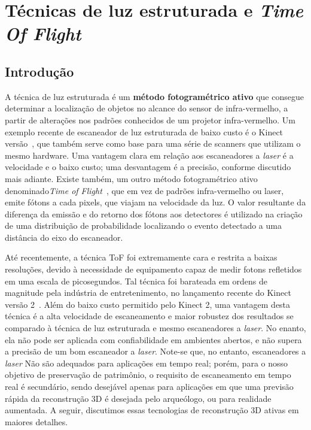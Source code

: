\chapter{Técnicas de luz estruturada e \emph{Time Of Flight}}\label{cap:kinect}

\section*{Introdução}

A técnica de luz estruturada é um
\textbf{método fotogramétrico ativo} que consegue determinar a localização de objetos
no alcance do sensor de infra-vermelho, a partir de alterações nos padrões conhecidos de um projetor 
infra-vermelho. Um exemplo recente de escaneador de luz estruturada de baixo custo
é o Kinect versão~\cite{smisek20133d}, que também serve como base para uma
série de scanners que utilizam o mesmo hardware. Uma vantagem clara em relação
aos escaneadores a \emph{laser} é a velocidade e o baixo custo; uma desvantagem
é a precisão, conforme discutido mais adiante.  Existe também, um outro método
fotogramétrico ativo denominado\emph{Time of Flight}~\cite{gokturk2004time},
que em vez de padrões infra-vermelho ou laser, emite fótons a cada pixels, que
viajam na velocidade da luz. O valor resultante da diferença da
emissão e do retorno dos fótons aos
detectores é utilizado na criação de uma distribuição de probabilidade 
localizando o evento detectado a uma distância do eixo do escaneador.

Até recentemente, a técnica ToF foi extremamente cara e restrita a baixas resoluções, devido à
necessidade de equipamento capaz de medir fotons refletidos em uma escala de
picosegundos. Tal técnica foi barateada em ordens de magnitude pela indústria
de entretenimento, no lançamento recente do Kinect versão
2~\cite{lachat2015first,valgma20163d}. Além do baixo custo permitido pelo
Kinect 2, uma vantagem desta técnica é a alta velocidade de escaneamento e
maior robustez dos resultados se comparado à técnica de luz estruturada e mesmo escaneadores a \emph{laser}.
No enanto, ela não pode ser aplicada com confiabilidade em ambientes abertos,
e não supera a precisão de um bom escaneador a \emph{laser}. Note-se que, no entanto, escaneadores a \emph{laser} Não são adequados para aplicações em tempo real; porém, para o nosso objetivo de preservação de patrimônio,
o requisito de escaneamento em tempo real é secundário, sendo desejável apenas para aplicações em que uma previsão rápida da reconstrução 3D é desejada pelo arqueólogo, ou para realidade aumentada.
A seguir, discutimos essas tecnologias de reconstrução 3D ativas em maiores detalhes.

